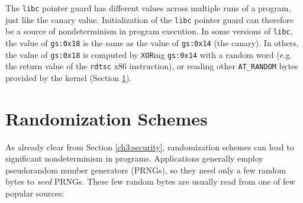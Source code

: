 The \texttt{libc} pointer guard has different values
across multiple runs of a program, just like the canary
value. Initialization of the \texttt{libc} pointer guard can 
therefore be a source of nondeterminism in program execution. 
In some versions of \texttt{libc}, the value of \texttt{gs:0x18} is the same
as the value of \texttt{gs:0x14} (the canary). In others,
the value of \texttt{gs:0x18} is computed by \texttt{XOR}ing \texttt{gs:0x14} with 
a random word (e.g. the return value of the \texttt{rdtsc} x86 instruction),
or reading other \texttt{AT\_RANDOM} bytes provided by the kernel
 (Section \ref{ch3:rand}).

\section{Randomization Schemes} \label{ch3:rand}
As already clear from Section \ref{ch3:security}, 
randomization schemes can lead to significant nondeterminism 
in programs. Applications generally employ pseudorandom number
generators (PRNGs), so they need only a few random
bytes to {\em seed} PRNGs. 
These few random bytes are
usually read from one of few popular sources:

